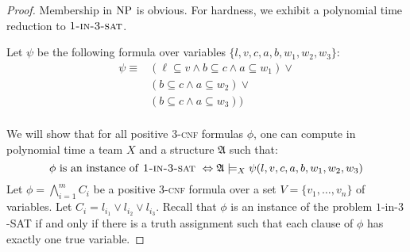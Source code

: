 \documentclass{article}
\theoremstyle{plain}
\theoremstyle{definition}
\newcommand{\mA}{{\mathfrak A}}
\newcommand{\np}{{\rm NP}}
\newcommand{\pb}[1]{\textsc{#1}}
\def\one{w_1}
\def\two{w_2}
\def\three{w_3}
\begin{document}
\begin{proof} Membership in $\np$ is obvious. For hardness, we exhibit a polynomial time reduction to $\pb{1-in-3-sat}$. 

Let $\psi$ be the following formula over variables $\{l,v,c,a,b,\one,\two,\three\}$:
\[	
	\begin{array}{rl}
	\psi  \equiv & (\ell \subseteq v \wedge b \subseteq c \wedge a \subseteq \one) \vee \\
	& ( b \subseteq c \wedge a \subseteq \two) \vee \\
	& ( b \subseteq c \wedge a \subseteq \three)) \\
	\end{array}
\]


	We will show that for all   positive $3$-\pb{cnf} formulas $\phi$, one can compute in polynomial time a team $X$ and a structure $\mA$ such that:
	$$\phi \text{ is an instance of \pb{1-in-3-sat} } \Leftrightarrow \mA \models_X \psi(l,v,c,a,b,\one,\two,\three)$$
Let $\phi = \bigwedge_{i=1}^m C_i$ be a positive $3$-\pb{cnf} formula over a set $V = \{v_1, \hdots, v_n\}$ of variables. Let $C_i = l_{i_1} \vee l_{i_2} \vee l_{i_3}$.  Recall that $\phi$ is an instance of  the problem $1$-in-$3$-SAT if and only if there is a truth assignment such that each  clause of $\phi$ has exactly one true variable.
	

\end{proof}
\end{document}

